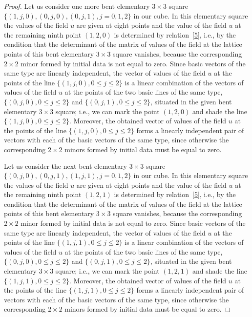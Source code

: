 \begin{proof}
Let us consider one more bent elementary $3 \times 3$ square $\{(1,
j, 0), (0, j, 0), (0, j, 1),  j = 0, 1, 2\}$ in our cube. In this
elementary square the values of the f\/ield $u$ are given at eight
points and the value of the f\/ield $u$ at the remaining ninth point
$(1, 2, 0)$ is determined by relation~\eqref{5}, i.e., by the
condition that the determinant of the matrix of values of the f\/ield
at the lattice points of this bent elementary $3 \times 3$ square
vanishes, because the corresponding $2 \times 2$ minor formed by
initial data is not equal to zero. Since basic vectors of the same
type are linearly independent, the vector of values of the f\/ield $u$
at the points of the line $\{(1, j, 0), 0 \leq j \leq 2\}$ is a
linear combination of the vectors of values of the f\/ield $u$ at the
points of the two basic lines of the same type, $\{(0, j, 0), 0 \leq
j \leq 2\}$ and $\{(0, j, 1), 0 \leq j \leq 2\}$, situated in the
given bent elementary $3 \times 3$ square; i.e., we can mark the
point $(1, 2, 0)$ and shade the line $\{(1, j, 0), 0 \leq j \leq
2\}$. Moreover, the obtained vector of values of the f\/ield $u$ at
the points of the line $\{(1, j, 0), 0 \leq j \leq 2\}$ forms a
linearly independent pair of vectors with each of the basic vectors
of the same type, since otherwise the corresponding $2 \times 2$
minors formed by initial data must be equal to zero.



Let us consider the next bent elementary $3 \times 3$ square $\{(0,
j, 0), (0, j, 1), (1, j, 1), j = 0, 1, 2\}$ in our cube. In this
elementary square the values of the f\/ield $u$ are given at eight
points and the value of the f\/ield $u$ at the remaining ninth point
$(1, 2, 1)$ is determined by relation~\eqref{5}, i.e., by the
condition that the determinant of the matrix of values of the f\/ield
at the lattice points of this bent elementary $3 \times 3$ square
vanishes, because the corresponding $2 \times 2$ minor formed by
initial data is not equal to zero. Since basic vectors of the same
type are linearly independent, the vector of values of the f\/ield $u$
at the points of the line $\{(1, j, 1), 0 \leq j \leq 2\}$ is a
linear combination of the vectors of values of the f\/ield $u$ at the
points of the two basic lines of the same type, $\{(0, j, 0), 0 \leq
j \leq 2\}$ and $\{(0, j, 1), 0 \leq j \leq 2\}$, situated in the
given bent elementary $3 \times 3$ square; i.e., we can mark the
point $(1, 2, 1)$ and shade the line $\{(1, j, 1), 0 \leq j \leq
2\}$. Moreover, the obtained vector of values of the f\/ield $u$ at
the points of the line $\{(1, j, 1), 0 \leq j \leq 2\}$ forms a
linearly independent pair of vectors with each of the basic vectors
of the same type, since otherwise the corresponding $2 \times 2$
minors formed by initial data must be equal to zero.




\end{proof}
